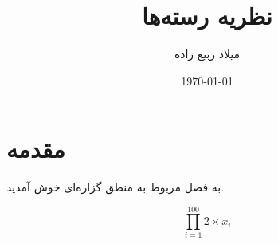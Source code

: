 \documentclass[12pt]{report}
\title{نظریه رسته‌ها}
\author{میلاد ربیع زاده}
\date{\today}
\begin{document}
\pagestyle{plain}
\setcounter{page}{1}

\maketitle

\tableofcontents

\newpage


\chapter{مقدمه}


به فصل مربوط به منطق گزاره‌ای خوش آمدید.

$$\prod_{i = 1}^{100} 2 \times x_i$$
\end{document}
